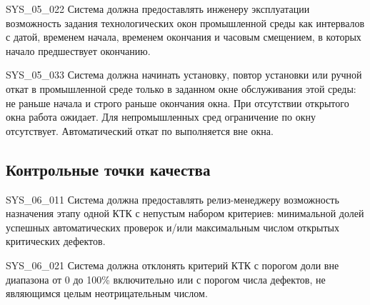 \documentclass{tpks}
\begin{document}
\begin{req}{SYS_05_02}{2}
Система должна предоставлять инженеру эксплуатации возможность задания технологических окон промышленной среды как интервалов с датой, временем начала, временем окончания и часовым смещением, в которых начало предшествует окончанию.
\end{req}

\begin{req}{SYS_05_03}{3}
Система должна начинать установку, повтор установки или ручной откат в промышленной
среде только в заданном окне обслуживания этой среды: не раньше начала и строго
раньше окончания окна. При отсутствии открытого окна работа ожидает.
Для непромышленных сред ограничение по окну отсутствует.
Автоматический откат по  выполняется вне окна.
\end{req}

\subsection{Контрольные точки качества}

\begin{req}{SYS_06_01}{1}
Система должна предоставлять релиз-менеджеру возможность назначения этапу одной КТК с непустым набором критериев: минимальной долей успешных автоматических проверок и/или максимальным числом открытых критических дефектов.
\end{req}

\begin{req}{SYS_06_02}{1}
Система должна отклонять критерий КТК с порогом доли вне диапазона от 0 до 100\% включительно или с порогом числа дефектов, не являющимся целым неотрицательным числом.
\end{req}
\end{document}
